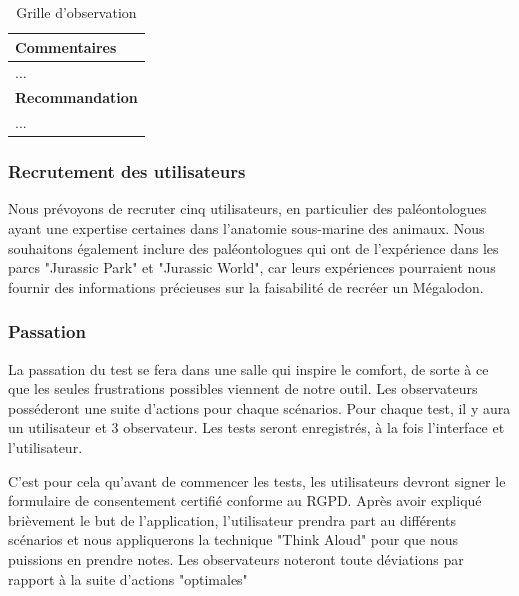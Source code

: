 \documentclass{article}
\begin{document}
\begin{table}[h]
\begin{tabular}{|p{6cm}|p{1.5cm}|p{1.5cm}|p{2.5cm}|}
		\multicolumn{4}{|p{14cm}|}{\textbf{Commentaires}}                                                                                              \\ \hline
		\multicolumn{4}{|p{14cm}|}{...}                                                                                                                \\ \hline
		\multicolumn{4}{|p{14cm}|}{\textbf{Recommandation}}                                                                                            \\ \hline
		\multicolumn{4}{|p{14cm}|}{...}                                                                                                                \\ \hline
	\end{tabular}
	\caption{\label{grille_observation} Grille d'observation}
\end{table}



\clearpage
\subsubsection{Recrutement des utilisateurs}
Nous prévoyons de recruter cinq utilisateurs, en particulier des paléontologues ayant une expertise certaines dans l'anatomie sous-marine des animaux. Nous souhaitons également inclure des paléontologues qui ont de l'expérience dans les parcs "Jurassic Park" et "Jurassic World", car leurs expériences pourraient nous fournir des informations précieuses sur la faisabilité de recréer un Mégalodon.

\subsubsection{Passation}
La passation du test se fera dans une salle qui inspire le comfort, de sorte à ce que les seules frustrations possibles viennent de notre outil. Les observateurs posséderont une suite d'actions pour chaque scénarios. Pour chaque test, il y aura un utilisateur et 3 observateur. Les tests seront enregistrés, à la fois l'interface et l'utilisateur.

C'est pour cela qu'avant de commencer les tests, les utilisateurs devront signer le formulaire de consentement certifié conforme au RGPD. Après avoir expliqué brièvement le but de l'application, l'utilisateur prendra part au différents scénarios et nous appliquerons la technique "Think Aloud" pour que nous puissions en prendre notes.
Les observateurs noteront toute déviations par rapport à la suite d'actions "optimales"
\end{document}

